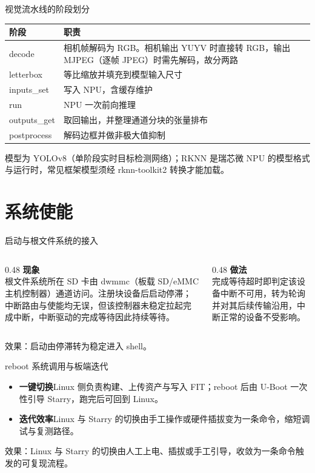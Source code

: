 \documentclass[aspectratio=169,fontset=mac]{ctexbeamer}
\newcommand{\hdr}[1]{\textsf{\bfseries\color{ink}#1}}
\newcommand{\headrow}{\rowcolor{tinthdr}}
\newcommand{\keyline}[1]{\par\vskip3pt\noindent\colorbox{tintbox}{\parbox{0.91\textwidth}{\color{ink}#1}}\par}
\begin{document}
\begin{frame}{视觉流水线的阶段划分}
\small
\begin{tabular}{@{}lp{}@{}}
\toprule
\headrow \hdr{阶段} & \hdr{职责}\\
\midrule
decode & 相机帧解码为 RGB。相机输出 YUYV 时直接转 RGB，输出 MJPEG（逐帧 JPEG）时需先解码，故分两路\\
letterbox & 等比缩放并填充到模型输入尺寸\\
inputs\_set & 写入 NPU，含缓存维护\\
run & NPU 一次前向推理\\
outputs\_get & 取回输出，并整理通道分块的张量排布\\
postprocess & 解码边框并做非极大值抑制\\
\bottomrule
\end{tabular}
\vskip4pt
\footnotesize 模型为 YOLOv8（单阶段实时目标检测网络）；RKNN 是瑞芯微 NPU 的模型格式与运行时，常见框架模型须经 rknn-toolkit2 转换才能加载。
\end{frame}

%
\section{系统使能}

\begin{frame}{启动与根文件系统的接入}
\begin{columns}[T]
\begin{column}{0.48\textwidth}
\textbf{\color{ink}现象}\\[2pt]
\small 根文件系统所在 SD 卡由 dwmmc（板载 SD/eMMC 主机控制器）通道访问。注册块设备后启动停滞；中断路由与使能均无误，但该控制器未稳定拉起完成中断，中断驱动的完成等待因此持续等待。
\end{column}
\begin{column}{0.48\textwidth}
\textbf{\color{ink}做法}\\[2pt]
\small 完成等待超时即判定该设备中断不可用，转为轮询并对其后续传输沿用，中断正常的设备不受影响。
\end{column}
\end{columns}
\keyline{效果：启动由停滞转为稳定进入 shell。}
\end{frame}

\begin{frame}{reboot 系统调用与板端迭代}
\begin{itemize}
\item \textbf{一键切换}\quad Linux 侧负责构建、上传资产与写入 FIT；reboot 后由 U-Boot 一次性引导 Starry，跑完后可回到 Linux。
\item \textbf{迭代效率}\quad Linux 与 Starry 的切换由手工操作或硬件插拔变为一条命令，缩短调试与复测路径。
\end{itemize}
\keyline{效果：Linux 与 Starry 的切换由人工上电、插拔或手工引导，收敛为一条命令触发的可复现流程。}
\end{frame}
\end{document}
